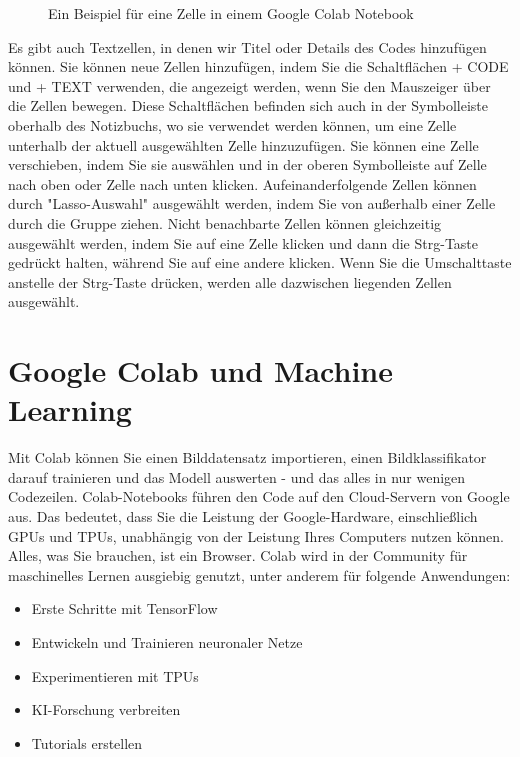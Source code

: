 \begin{figure}[H]
	\centering
	\caption{Ein Beispiel für eine Zelle in einem Google Colab Notebook}
\end{figure}

Es gibt auch Textzellen, in denen wir Titel oder Details des Codes hinzufügen können. 
Sie können neue Zellen hinzufügen, indem Sie die Schaltflächen + CODE und + TEXT verwenden, die angezeigt werden, wenn Sie den Mauszeiger über die Zellen bewegen. Diese Schaltflächen befinden sich auch in der Symbolleiste oberhalb des Notizbuchs, wo sie verwendet werden können, um eine Zelle unterhalb der aktuell ausgewählten Zelle hinzuzufügen.
Sie können eine Zelle verschieben, indem Sie sie auswählen und in der oberen Symbolleiste auf Zelle nach oben oder Zelle nach unten klicken.
Aufeinanderfolgende Zellen können durch "Lasso-Auswahl" ausgewählt werden, indem Sie von außerhalb einer Zelle durch die Gruppe ziehen. Nicht benachbarte Zellen können gleichzeitig ausgewählt werden, indem Sie auf eine Zelle klicken und dann die Strg-Taste gedrückt halten, während Sie auf eine andere klicken. Wenn Sie die Umschalttaste anstelle der Strg-Taste drücken, werden alle dazwischen liegenden Zellen ausgewählt.

\section{Google Colab und Machine Learning}

Mit Colab können Sie einen Bilddatensatz importieren, einen Bildklassifikator darauf trainieren und das Modell auswerten - und das alles in nur wenigen Codezeilen. Colab-Notebooks führen den Code auf den Cloud-Servern von Google aus. Das bedeutet, dass Sie die Leistung der Google-Hardware, einschließlich GPUs und TPUs, unabhängig von der Leistung Ihres Computers nutzen können. Alles, was Sie brauchen, ist ein Browser.
Colab wird in der Community für maschinelles Lernen ausgiebig genutzt, unter anderem für folgende Anwendungen:

\begin{itemize}
	\item Erste Schritte mit TensorFlow
	\item Entwickeln und Trainieren neuronaler Netze
	\item Experimentieren mit TPUs
	\item KI-Forschung verbreiten
	\item Tutorials erstellen
\end{itemize}	

